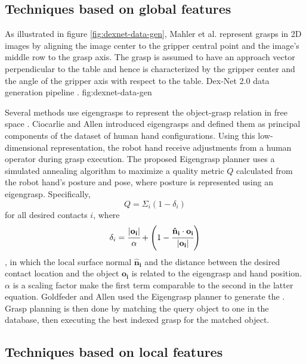 \subsection{Techniques based on global features}
As illustrated in figure \ref{fig:dexnet-data-gen}, Mahler et al. \cite{mahler2017} represent grasps in 2D images by
aligning the image center to the gripper central point and the image's middle row to the grasp axis. The grasp is
assumed to have an approach vector perpendicular to the table and hence is characterized by the gripper center and the
angle of the gripper axis with respect to the table.
             {Dex-Net 2.0 data generation pipeline \cite{mahler2017}.}
             {fig:dexnet-data-gen}{\textwidth}

Several methods use eigengrasps to represent the object-grasp relation in free space \cite{Goldfeder2011,Ciocarlie2009}.
Ciocarlie and Allen \cite{Ciocarlie2009} introduced eigengrasps and defined them as principal components of the dataset
of human hand configurations. Using this low-dimensional representation, the robot hand receive adjustments from a human
operator during grasp execution. The proposed Eigengrasp planner uses a simulated annealing algorithm to maximize a
quality metric $Q$ calculated from the robot hand's posture and pose, where posture is represented using an eigengrasp.
Specifically,
\begin{equation}
    Q = \Sigma_i (1 - \delta_i)
\end{equation}
for all desired contacts $i$, where
\begin{equation}
    \delta_i = \cfrac{|\mathbf{o_i}|}{\alpha}
    + \left(1 - \cfrac{\mathbf{\hat{n}_i} \cdot \mathbf{o_i}}{|\mathbf{o_i}|} \right)
\end{equation}
, in which the local surface normal $\mathbf{\hat{n}_i}$ and the distance between the desired contact location and the
object $\mathbf{o_i}$ is related to the eigengrasp and hand position. $\alpha$ is a scaling factor make the first term
comparable to the second in the latter equation. Goldfeder and Allen \cite{Goldfeder2011} used the Eigengrasp planner
to generate the . Grasp planning is then done by
matching the query object to one in the database, then executing the best indexed grasp for the matched object.

\subsection{Techniques based on local features} \label{subsub:object_grasp_local}

